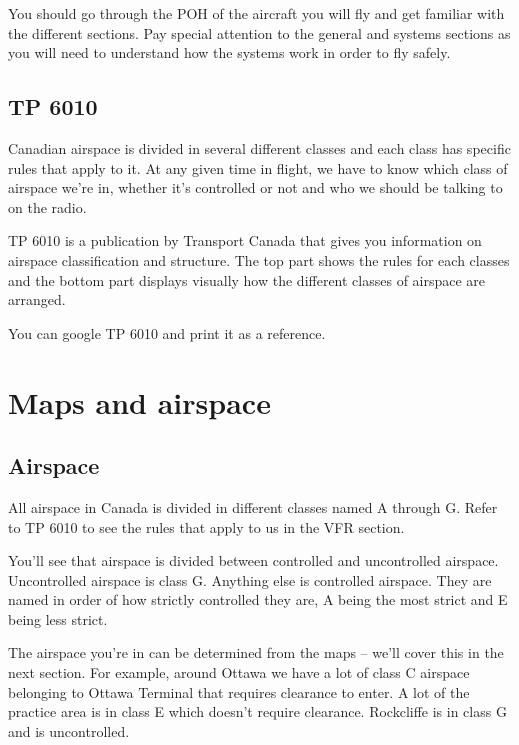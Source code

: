 \documentclass[12pt,letterpaper]{article}
\begin{document}
        You should go through the POH of the aircraft you will fly and get familiar with the different sections. Pay special attention to the general and systems sections as you will need to understand how the systems work in order to fly safely.
        
        \subsection{TP 6010}
        
        Canadian airspace is divided in several different classes and each class has specific rules that apply to it. At any given time in flight, we have to know which class of airspace we're in, whether it's controlled or not and who we should be talking to on the radio.
        
        TP 6010 is a publication by Transport Canada that gives you information on airspace classification and structure. The top part shows the rules for each classes and the bottom part displays visually how the different classes of airspace are arranged.
        
        You can google TP 6010 and print it as a reference.
    
    \section{Maps and airspace}
        \subsection{Airspace}
        All airspace in Canada is divided in different classes named A through G. Refer to TP 6010 to see the rules that apply to us in the VFR section. 
        
        You'll see that airspace is divided between controlled and uncontrolled airspace. Uncontrolled airspace is class G. Anything else is controlled airspace. They are named in order of how strictly controlled they are, A being the most strict and E being less strict.
        
        The airspace you're in can be determined from the maps -- we'll cover this in the next section. For example, around Ottawa we have a lot of class C airspace belonging to Ottawa Terminal that requires clearance to enter. A lot of the practice area is in class E which doesn't require clearance. Rockcliffe is in class G and is uncontrolled.
        
\end{document}
